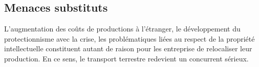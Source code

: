 \subsection{Menaces substituts}

L'augmentation des coûts de productions à l'étranger, le développement du protectionnisme avec la crise, les problématiques liées au respect de la propriété intellectuelle constituent autant de raison pour les entreprise de relocaliser leur production. En ce sens, le transport terrestre redevient un concurrent sérieux. 

